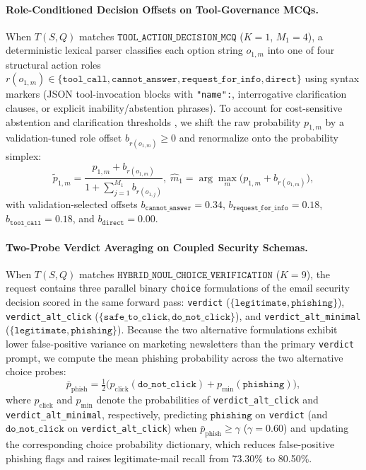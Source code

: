 \documentclass[10pt,twocolumn]{article}
\begin{document}
\paragraph{Role-Conditioned Decision Offsets on Tool-Governance MCQs.}
When $T(S, Q)$ matches $\texttt{TOOL\_ACTION\_DECISION\_MCQ}$ ($K = 1$, $M_1 = 4$), a deterministic lexical parser classifies each option string $o_{1,m}$ into one of four structural action roles $r(o_{1,m}) \in \{\texttt{tool\_call},\allowbreak \texttt{cannot\_answer},\allowbreak \texttt{request\_for\_info},\allowbreak \texttt{direct}\}$ using syntax markers (JSON tool-invocation blocks with \texttt{"name":}, interrogative clarification clauses, or explicit inability/abstention phrases). To account for cost-sensitive abstention and clarification thresholds \citep{elkan2001foundations}, we shift the raw probability $p_{1,m}$ by a validation-tuned role offset $b_{r(o_{1,m})} \ge 0$ and renormalize onto the probability simplex:
\begin{equation}
    \tilde{p}_{1,m} = \frac{p_{1,m} + b_{r(o_{1,m})}}{1 + \sum_{j=1}^{M_1} b_{r(o_{1,j})}}, \; \hat{m}_1 = \arg\max_{m} \big(p_{1,m} + b_{r(o_{1,m})}\big),
    \label{eq:role_calib}
\end{equation}
with validation-selected offsets $b_{\texttt{cannot\_answer}} = 0.34$, $b_{\texttt{request\_for\_info}} = 0.18$, $b_{\texttt{tool\_call}} = 0.18$, and $b_{\texttt{direct}} = 0.00$.

\paragraph{Two-Probe Verdict Averaging on Coupled Security Schemas.}
When $T(S, Q)$ matches $\texttt{HYBRID\_NOUL\_CHOICE\_VERIFICATION}$ ($K = 9$), the request contains three parallel binary \texttt{choice} formulations of the email security decision scored in the same forward pass: \texttt{verdict} ($\{\texttt{legitimate}, \texttt{phishing}\}$), \texttt{verdict\_alt\_click} ($\{\texttt{safe\_to\_click}, \texttt{do\_not\_click}\}$), and \texttt{verdict\_alt\_minimal} ($\{\texttt{legitimate}, \texttt{phishing}\}$). Because the two alternative formulations exhibit lower false-positive variance on marketing newsletters than the primary \texttt{verdict} prompt, we compute the mean phishing probability across the two alternative choice probes:
\begin{equation}
    \bar{p}_{\text{phish}} = \tfrac{1}{2}\big(p_{\text{click}}(\texttt{do\_not\_click}) + p_{\text{min}}(\texttt{phishing})\big),
    \label{eq:phish_consensus}
\end{equation}
where $p_{\text{click}}$ and $p_{\text{min}}$ denote the probabilities of \texttt{verdict\_alt\_click} and \texttt{verdict\_alt\_minimal}, respectively, predicting $\texttt{phishing}$ on \texttt{verdict} (and $\texttt{do\_not\_click}$ on \texttt{verdict\_alt\_click}) when $\bar{p}_{\text{phish}} \ge \gamma$ ($\gamma = 0.60$) and updating the corresponding choice probability dictionary, which reduces false-positive phishing flags and raises legitimate-mail recall from 73.30\% to 80.50\%.
\end{document}
